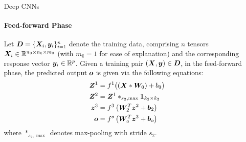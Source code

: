 %
%
%
%
\begin{frame}{Deep CNNs}
\framesubtitle{Feed-forward Phase}
Let ${\boldsymbol D} = \{{\boldsymbol X}_i, {\boldsymbol y}_i\}_{i=1}^n$ denote the training data,
comprising $n$ tensors ${\boldsymbol X}_i \in {\mathord{\mathbb R}}^{n_0 \times n_0 \times m_0}$ (with
$m_0 = 1$ for ease of explanation) and
the corresponding response vector ${\boldsymbol y}_i \in {\mathord{\mathbb R}}^p$.
Given a training pair $({\boldsymbol X}, {\boldsymbol y}) \in {\boldsymbol D}$, 
in the feed-forward phase, the predicted output ${\boldsymbol o}$ is given via the
following equations:
\begin{align*}
    {\boldsymbol Z}^1 & = f^1\bigl( \left({\boldsymbol X} \ast {\boldsymbol W}_0\right) + b_0 \bigr)\\
    {\boldsymbol Z}^2 & = {\boldsymbol Z}^1 \ast_{s_2, \max} \mathbf{1}_{k_2 \times k_2}\\
    {\boldsymbol z}^3 & = f^3\left( {\boldsymbol W}^T_{2} {\boldsymbol z}^2 + {\boldsymbol b}_{2} \right)\\
    {\boldsymbol o} & = f^o \left( {\boldsymbol W}_o^T {\boldsymbol z}^3 + {\boldsymbol b}_o \right)
\end{align*}
where $\ast_{s_2,\max}$ denotes max-pooling with stride $s_2$. 
\end{frame}
%
%
